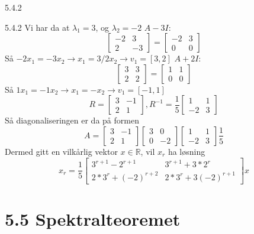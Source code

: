 \documentclass[a4paper,norsk]{article}
\begin{document}
\begin{oppgavebox}{5.4.2}{}
\begin{proofbox}{5.4.2}{}
Vi har da at $ \lambda_1 = 3 $, og $ \lambda_2 =-2 $  
$ A-3I: $
\[
    \begin{bmatrix}
        -2&3\\
        2&-3
    \end{bmatrix} = \begin{bmatrix}
        -2& 3\\
        0&0
    \end{bmatrix} 
\]Så $ -2x_1 = -3x_2 \rightarrow x_1 = 3/2 x_2 \rightarrow v_1 = \left[ 3, 2 \right] $  
$ A+2I: $
\[
    \begin{bmatrix}
        3&3\\
        2&2
    \end{bmatrix} = \begin{bmatrix}
        1& 1\\
        0&0
    \end{bmatrix} 
\]Så $ 1x_1 = -1x_2 \rightarrow x_1 = -x_2 \rightarrow v_1 = \left[ -1, 1 \right] $  
\[
    R = \begin{bmatrix}
        3&-1\\
        2&1
    \end{bmatrix}, R^{-1} = \frac{ 1 }{ 5 } \begin{bmatrix}
        1&1\\
        -2&3
    \end{bmatrix} 
\]Så diagonaliseringen er da på formen
\[
    A = \begin{bmatrix}
        3&-1\\
        2&1
    \end{bmatrix} \begin{bmatrix}
        3&0\\
        0&-2
    \end{bmatrix} \begin{bmatrix}
        1&1\\
        -2&3
    \end{bmatrix} \frac{ 1 }{ 5 }
\] Dermed gitt en vilkårlig vektor $ x \in \mathbb{R} $, vil $ x_r $  ha løsning 
\[
    x_r = \frac{ 1 }{ 5 } \begin{bmatrix}
        3^{r+1}-2^{r+1} & 3^{r+1} + 3*2^r\\
        2*3^r+(-2)^{r+2} & 2*3^r + 3 (-2)^{r+1}
    \end{bmatrix} x
\]
\end{proofbox}
\end{oppgavebox}

\section*{5.5 Spektralteoremet}
\end{document}
